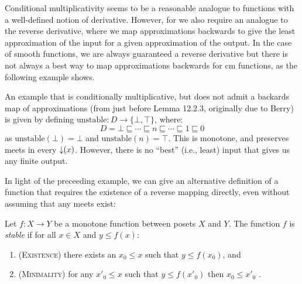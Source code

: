 \begin{example}
\end{example}

Conditional multiplicativity seems to be a reasonable analogue to functions with a well-defined notion of derivative. However, for \GPS we also require an analogue to the reverse derivative, where we map approximations backwards to give the least approximation of the input for a given approximation of the output. In the case of smooth functions, we are always guaranteed a reverse derivative but there is not always a best way to map approximations backwards for cm functions, as the following example shows.

\begin{example}
  \label{ex:non-stable-function}
  An example that is conditionally multiplicative, but does not admit a backards map of approximations (from \citet{amadio-curien} just before Lemma 12.2.3, originally due to Berry) is given by defining $\mathrm{unstable} : D \to \{\bot, \top\}$, where:
  \begin{displaymath}
    D = \bot \sqsubseteq \cdots \sqsubseteq n \sqsubseteq \cdots \sqsubseteq 1 \sqsubseteq 0
  \end{displaymath}
  as $\mathrm{unstable}(\bot) = \bot$ and $\mathrm{unstable}(n) = \top$. This is monotone, and preserves meets in every $\mathop{\downarrow}(x)$. However, there is no ``best'' (i.e., least) input that gives us any finite output.
\end{example}

In light of the preceeding example, we can give an alternative
definition of a function that requires the existence of a reverse
mapping directly, even without assuming that any meets exist:

\begin{definition}
  Let $f : X \to Y$ be a monotone function between posets $X$ and
  $Y$. The function $f$ is \emph{stable} if for all $x \in X$ and
  $y \leq f(x)$:
  \begin{enumerate}
  \item (\textsc{Existence}) there exists an $x_0 \leq x$ such that $y \leq f(x_0)$, and
  \item (\textsc{Minimality}) for any $x'_0 \leq x$ such that $y \leq f(x'_0)$ then
    $x_0 \leq x'_0$ .
  \end{enumerate}
\end{definition}

